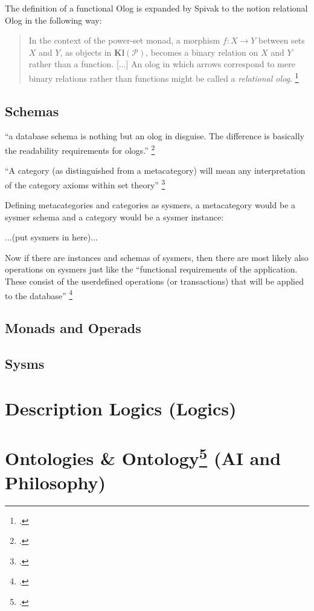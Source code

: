 \documentclass[12pt,a4paper]{article}
\begin{document}
The definition of a functional Olog is expanded by Spivak to the notion relational Olog in the following way:
\begin{quote}
In the context of the power-set monad, a morphism \( f: X \to Y \) between sets \( X \) and \( Y \), as objects in \( \textbf{Kl}(\mathcal{P}) \), becomes a binary relation on \( X \) and \( Y \) rather than a function. [...] An olog in which arrows correspond to mere binary relations rather than functions might 
be called a \textit{relational olog}. \footcite[447]{Spivak2014}
\end{quote}

\subsection{Schemas}
``a database schema is nothing but an olog in disguise. The diﬀerence is basically the readability requirements for ologs.'' \footcite[194]{Spivak2014}

``A category (as distinguished from a metacategory) will mean any interpretation of the category axioms within set theory'' \footcite[10]{MacLane1997}

Defining metacategories and categories as sysmers, a metacategory would be a sysmer schema and a category would be a sysmer instance:

...(put sysmers in here)...

Now if there are instances and schemas of sysmers, then there are most likely also operations on sysmers just like the ``functional requirements of the application. These consist of the userdefined operations (or transactions) that will be applied to the database'' \footcite[61]{ElmasriNavathe2015}

\subsection{Monads and Operads}

\subsection{Sysms}

\section{Description Logics (Logics)}

\section{Ontologies \& Ontology\footcite{Platon2010} (AI and Philosophy)}
\end{document}
